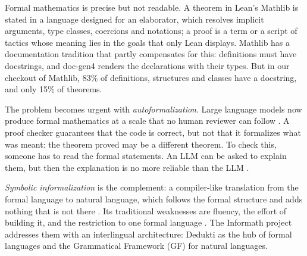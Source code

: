 \documentclass{easychair}
\begin{document}
Formal mathematics is precise but not readable. A theorem in Lean's Mathlib
\cite{mathlib-2020} is stated in a language designed for an elaborator, which resolves implicit
arguments, type classes, coercions and notations; a proof is a term or a script of tactics whose
meaning lies in the goals that only Lean displays. Mathlib has a documentation tradition that
partly compensates for this: definitions must have docstrings, and doc-gen4 \cite{doc-gen4}
renders the declarations with their types. But in our checkout of Mathlib, 83\% of definitions,
structures and classes have a docstring, and only 15\% of theorems.

The problem becomes urgent with \emph{autoformalization}. Large language models now produce
formal mathematics at a scale that no human reviewer can follow \cite{urban-2026}. A proof
checker guarantees that the code is correct, but not that it formalizes what was meant: the
theorem proved may be a different theorem. To check this, someone has to read the formal
statements. An LLM can be asked to explain them, but then the explanation is no more reliable
than the LLM \cite{jiang-al-2024,gao-al-2025}.

\emph{Symbolic informalization} is the complement: a compiler-like translation from the formal
language to natural language, which follows the formal structure and adds nothing that is not
there \cite{ranta-2024}. Its traditional weaknesses are fluency, the effort of building it,
and the restriction to one formal language \cite{jiang-al-2024}. The Informath project
\cite{informath-homepage} addresses them with an interlingual architecture: Dedukti
\cite{assaf-al-2023} as the hub of formal languages and the Grammatical Framework (GF)
\cite{ranta-2004,ranta-2011} for natural languages.
\end{document}

